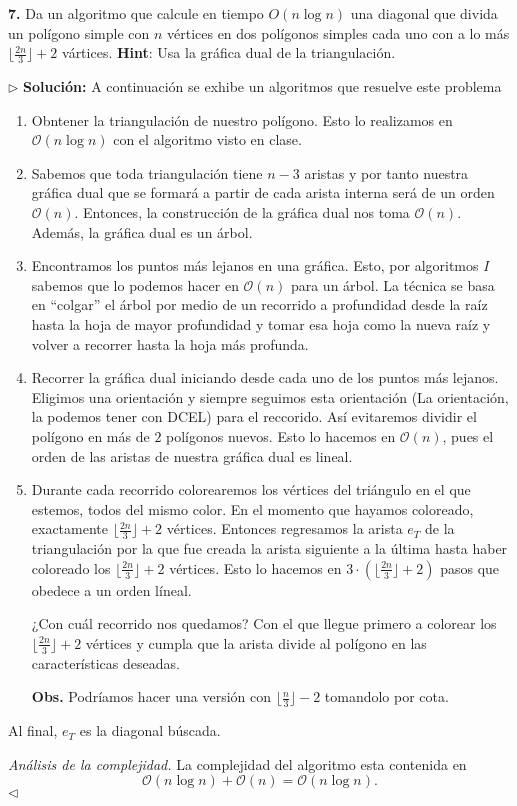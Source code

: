 \textbf{7.} Da un algoritmo que calcule en tiempo $O(n \log n)$ una diagonal que divida un
polígono simple con $n$ vértices en dos polígonos simples cada uno con a lo más
$\lfloor \frac{2n}{3} \rfloor + 2$ vártices. \textbf{Hint}: Usa la gráfica dual de la triangulación.
\newline

$\rhd$ \textbf{Solución:} A continuación se exhibe un algoritmos que resuelve este problema
\begin{enumerate}
\item Obntener la triangulación de nuestro polígono. Esto lo realizamos en $\mathcal{O}(n \log n)$
  con el algoritmo visto en clase.
\item Sabemos que toda triangulación tiene $n - 3$ aristas y por tanto nuestra gráfica dual que
  se formará a partir de cada arista interna será de un orden $\mathcal{O}(n)$. Entonces, la
  construcción de la gráfica dual nos toma $\mathcal{O}(n)$. Además, la gráfica dual es un árbol.
\item Encontramos los puntos más lejanos en una gráfica. Esto, por algoritmos $I$ sabemos que
  lo podemos hacer en $\mathcal{O}(n)$ para un árbol. La técnica se basa en ``colgar'' el árbol
  por medio de un recorrido a profundidad desde la raíz hasta la hoja de mayor profundidad y
  tomar esa hoja como la nueva raíz y volver a recorrer hasta la hoja más profunda.
\item  Recorrer la gráfica dual iniciando desde cada uno de los puntos más lejanos. Eligimos una
  orientación y siempre seguimos esta orientación (La orientación, la podemos tener con DCEL) para
  el reccorido. Así evitaremos dividir el polígono en más de $2$ polígonos nuevos. Esto lo hacemos
  en $\mathcal{O}(n)$, pues el orden de las aristas de nuestra gráfica dual es lineal.
\item Durante cada recorrido colorearemos los vértices del triángulo en el que estemos, todos
  del mismo color. En el momento que hayamos coloreado, exactamente $\lfloor \frac{2n}{3} \rfloor + 2$
  vértices. Entonces regresamos la arista $e_T$ de la triangulación por la que fue creada la arista
  siguiente a la última hasta haber coloreado los  $\lfloor \frac{2n}{3} \rfloor + 2$ vértices.
  Esto lo hacemos en $3 \cdot \left( \lfloor \frac{2n}{3} \rfloor + 2\right)$ pasos que obedece
  a un orden líneal.\newline
  
  ¿Con cuál recorrido nos quedamos? Con el que llegue primero a colorear los $\lfloor \frac{2n}{3} \rfloor + 2$
  vértices y cumpla que la arista divide al polígono en las características deseadas.\newline

  \textbf{Obs.} Podríamos hacer una versión con $\lfloor \frac{n}{3} \rfloor - 2$ tomandolo por cota.
\end{enumerate}
Al final, $e_T$ es la diagonal búscada.\newline

\textit{Análisis de la complejidad.} La complejidad del algoritmo esta contenida en
\[\mathcal{O}(n \log n) + \mathcal{O}(n) = \mathcal{O}(n \log n).\]
\hfill $\lhd$
